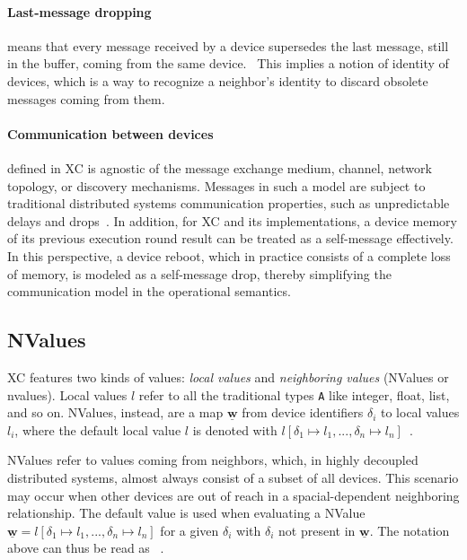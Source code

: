 \paragraph{Last-message dropping} means that every message received by a device supersedes the last message, still in the buffer, coming from the same device.~\cite{xc}
%
This implies a notion of identity of devices, which is a way to recognize a neighbor's identity to discard obsolete messages coming from them.

\paragraph{Communication between devices} defined in \ac{XC} is agnostic of the message exchange medium, channel, network topology, or discovery mechanisms.
%
Messages in such a model are subject to traditional distributed systems communication properties, such as unpredictable delays and drops~\cite{xc}.
%
In addition, for \ac{XC} and its implementations, a device memory of its previous execution round result can be treated as a self-message effectively.
%
In this perspective, a device reboot, which in practice consists of a complete loss of memory, is modeled as a self-message drop, thereby simplifying the communication model in the operational semantics.

\subsection{NValues} \label{chap:background->sec:xc->subsec:nvalues}

\ac{XC} features two kinds of values: \textit{local values} and \textit{neighboring values} (NValues or nvalues).
%
Local values $l$ refer to all the traditional types \texttt{A} like integer, float, list, and so on.
%
NValues, instead, are a map $\underline{\mathbf{w}}$ from device identifiers $\delta_i$ to local values $l_i$, where the default local value $l$ is denoted with $l[\delta_1 \mapsto l_1, ..., \delta_n \mapsto l_n]$~\cite{xc}.

NValues refer to values coming from neighbors, which, in highly decoupled distributed systems, almost always consist of a subset of all devices.
%
This scenario may occur when other devices are out of reach in a spacial-dependent neighboring relationship.
%
The default value is used when evaluating a NValue $\underline{\mathbf{w}} = l[\delta_1 \mapsto l_1, ..., \delta_n \mapsto l_n]$ for a given $\delta_i$ with $\delta_i$ not present in $\underline{\mathbf{w}}$.
%
The notation above can thus be read as ~\cite{xc}.

